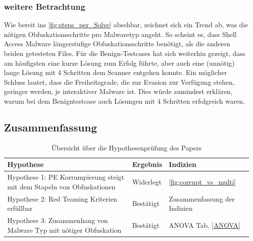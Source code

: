 \subsubsection{weitere Betrachtung}
Wie bereit ins \ref{fig:steps_per_Solve} absehbar, zeichnet sich ein Trend ab, was die nötigen Obfuskationsschritte pro Malwaretyp angeht. So scheint es, dass Shell Access Malware längerstufige Obfuskationsschritte benötigt, als die anderen beiden getesteten Files. Für die Benign-Testcases hat sich weiterhin gezeigt, dass am häufigsten eine kurze Lösung zum Erfolg führte, aber auch eine (unnötig) lange Lösung mit 4 Schritten dem Scanner entgehen konnte. Ein möglicher Schluss lautet, dass die Freiheitsgrade, die zur Evasion zur Verfügung stehen, geringer werden, je interaktiver Malware ist. Dies würde zumindest erklären, warum bei dem Benigntestcase auch Lösungen mit 4 Schritten erfolgreich waren.

\subsection{Zusammenfassung}
\begin{table}[h]
    \centering
    \begin{tabular}{|l|l|l|}
        \hline
        \textbf{Hypothese} & \textbf{Ergebnis} & \textbf{Indizien} \\ \hline
        Hypothese 1: PE Korrumpierung steigt mit dem Stapeln von Obfuskationen & Widerlegt& \ref{fig:corrupt_vs_multi} \\ \hline
        Hypothese 2: Red Teaming Kriterien erfüllbar & Bestätigt & Zusammenfassung der Indizien \\ \hline
        Hypothese 3: Zusammenhang von Malware Typ mit nötiger Obfuskation & Bestätigt & ANOVA Tab. \ref{ANOVA} \\ \hline
    \end{tabular}
    \caption{Übersicht über die Hypothesenprüfung des Papers}
    \label{tab:hypothesenpruefung}
\end{table}